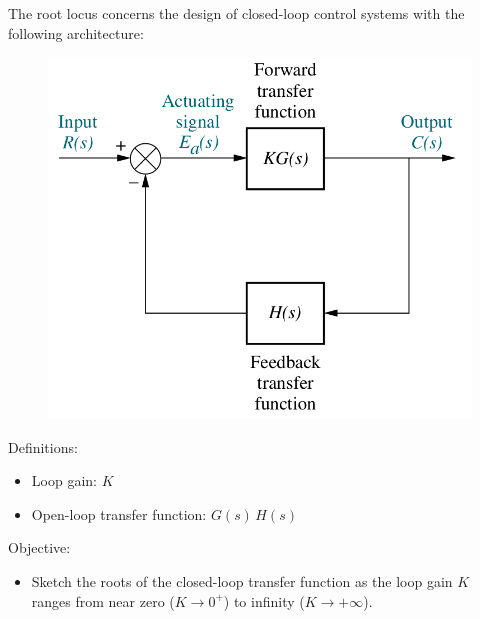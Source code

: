 \documentclass[ 10pt, xcolor = dvipsnames]{beamer}
\begin{document}
\begin{frame}[allowframebreaks]
\frametitle{\insertsection}

The root locus concerns the design of closed-loop control systems with the following architecture: 
\begin{figure}
\centering
\includegraphics[width=0.5\columnwidth]{figures/Nise_Figure-8-1.jpg}
\end{figure}
\framebreak

Definitions: 
\begin{itemize}
\item Loop gain: $K$
\item Open-loop transfer function: $G(s) \, H(s)$
\end{itemize}
\fullskip

Objective: 
\begin{itemize}
\item Sketch the roots of the closed-loop transfer function as the loop gain $K$ \linebreak ranges from near zero (\ie $K \rightarrow 0^+$) to infinity (\ie $K \rightarrow +\infty$). 
\end{itemize}

\end{frame}
\end{document}

